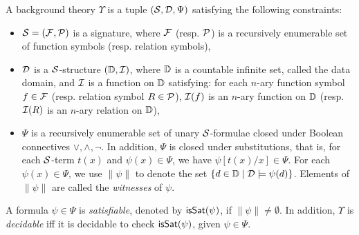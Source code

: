 \begin{definition}
A background theory  $\Upsilon$ is a tuple $(\mathcal{S}, \mathcal{D}, \Psi)$ satisfying the following constraints:
\begin{itemize}
\item $\mathcal{S}=({\mathcal{F}}, {\mathcal{P}})$ is a signature, where ${\mathcal{F}}$ (resp. ${\mathcal{P}}$) is a recursively enumerable set of function symbols (resp. relation symbols), 
%

\item $\mathcal{D}$ is a $\mathcal{S}$-structure $(\mathbb{D}, \mathcal{I})$, where $\mathbb{D}$ is a countable infinite set, called the data domain, 
and $\mathcal{I}$ is a function on $\mathbb{D}$ satisfying: for each $n$-ary function symbol $f \in {\mathcal{F}}$ (resp. relation symbol $R \in {\mathcal{P}}$), $\mathcal{I}(f)$ is an $n$-ary function on $\mathbb{D}$ (resp. $\mathcal{I}(R)$ is an $n$-ary relation on $\mathbb{D}$),
%
\item $\Psi$ is a recursively enumerable set of unary $\mathcal{S}$-formulae closed under Boolean connectives $\vee, \wedge, \neg$. In addition, $\Psi$ is closed under substitutions, that is, for each $\mathcal{S}$-term $t(x)$ and $\psi(x) \in \Psi$, we have $\psi[t(x)/x] \in \Psi$.
For each $\psi(x) \in \Psi$, we use $\|\psi\|$ to denote the set $\{d \in \mathbb{D} \mid  \mathcal{D} \models \psi(d)\}$. Elements of $\| \psi\|$ are called the \emph{witnesses} of $\psi$.
\end{itemize}
A formula $\psi \in \Psi$ is \emph{satisfiable}, denoted by $\mathsf{isSat}(\psi)$, if $\|\psi\| \neq \emptyset$. In addition, $\Upsilon$ is \emph{decidable} iff it is decidable to check $\mathsf{isSat}(\psi)$, given $\psi \in\Psi$.
\end{definition}

